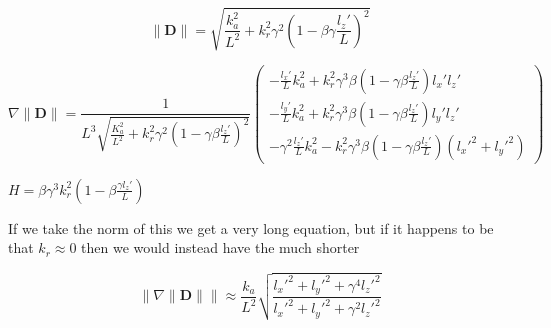 \begin{derivation}

\begin{equation}
	\|\mathbf{D}\| = \sqrt{ \frac{k_a^2}{L^2} + k_r^2 \gamma^2\left( 1-\beta \gamma \frac{l_z'}{L} \right)^2 }
\end{equation}


\begin{equation}
	\nabla \|\mathbf{D}\| = \frac{1}{L^3 \sqrt{\frac{K_a^2}{L^2} + k_r^2\gamma^2(1-\gamma\beta\frac{l_z'}{L})^2}}
	\begin{pmatrix}
		-\frac{l_x'}{L} k_a^2 + k_r^2 \gamma^3 \beta (1-\gamma\beta \frac{l_z'}{L}) l_x'l_z' \\
		-\frac{l_y'}{L} k_a^2 + k_r^2 \gamma^3 \beta (1-\gamma\beta \frac{l_z'}{L}) l_y'l_z' \\
		-\gamma^2\frac{l_z'}{L} k_a^2 - k_r^2 \gamma^3 \beta (1-\gamma\beta \frac{l_z'}{L}) (l_x'^2 + l_y'^2)
	\end{pmatrix}
\end{equation}

$H=\beta \gamma^3 k_r^2 (1-\beta\frac{\gamma l_z'}{L})$

\end{derivation}



If we take the norm of this we get a very long equation, but if it happens to be that $k_r \approx 0$ then we would instead have the much shorter

\begin{equation}
	\Big\| \nabla \|\mathbf{D}\| \Big\| \approx \frac{k_a}{ L^2} \sqrt{ \frac{l_x'^2+l_y'^2+\gamma^4 l_z'^2}{l_x'^2+l_y'^2+\gamma^2 l_z'^2} }
\end{equation}

